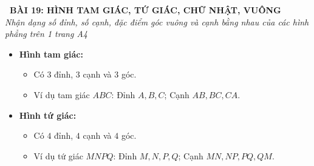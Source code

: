 \documentclass[12pt,a4paper]{article}
\begin{document}
\begin{tcolorbox}[
  enhanced,
  colback=teal!8!white,
  colframe=teal!70!black,
  arc=3mm, boxrule=1.2pt,
  left=3mm, right=3mm, top=2mm, bottom=2mm,
  halign=center
]
  {\LARGE\bfseries\color{teal!90!black}\faBookmark\ BÀI 19: HÌNH TAM GIÁC, TỨ GIÁC, CHỮ NHẬT, VUÔNG}\\[1mm]
  {\itshape\footnotesize\color{black!75} Nhận dạng số đỉnh, số cạnh, đặc điểm góc vuông và cạnh bằng nhau của các hình phẳng trên 1 trang A4}
\end{tcolorbox}

\vspace{-2mm}

\noindent
\begin{minipage}[t]{0.49\textwidth}\vspace{0pt}
\begin{tcolorbox}[
  enhanced,
  colback=blue!4!white,
  colframe=blue!75!black,
  arc=2mm, boxrule=0.8pt,
  left=2mm, right=2mm, top=1.8mm, bottom=1.8mm,
  title={\footnotesize\bfseries\color{white}\faSquareO\ 1. Hình tam giác \& Hình tứ giác}
]
{\footnotesize
\begin{itemize}\setlength{\itemsep}{1pt}\setlength{\leftskip}{-2.5mm}
  \item \textbf{Hình tam giác:}
  \begin{itemize}\setlength{\itemsep}{0.5pt}\setlength{\leftskip}{-2.5mm}
    \item Có $3$ đỉnh, $3$ cạnh và $3$ góc.
    \item Ví dụ tam giác $ABC$: Đỉnh $A, B, C$; Cạnh $AB, BC, CA$.
  \end{itemize}
  \item \textbf{Hình tứ giác:}
  \begin{itemize}\setlength{\itemsep}{0.5pt}\setlength{\leftskip}{-2.5mm}
    \item Có $4$ đỉnh, $4$ cạnh và $4$ góc.
    \item Ví dụ tứ giác $MNPQ$: Đỉnh $M, N, P, Q$; Cạnh $MN, NP, PQ, QM$.
  \end{itemize}
\end{itemize}
}
\end{tcolorbox}
\end{minipage}
\hfill
\end{document}
